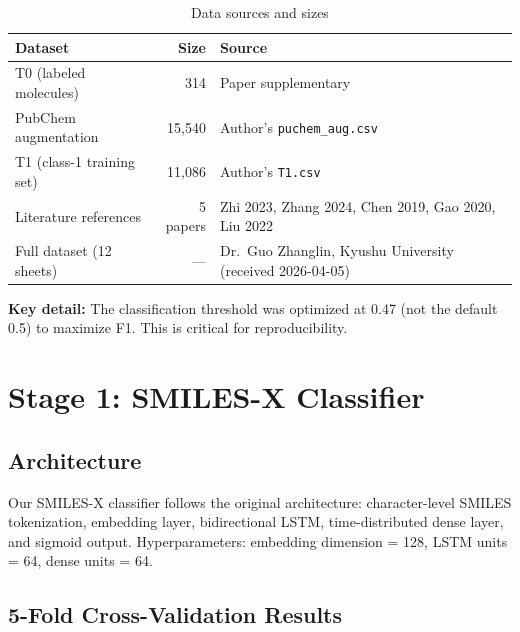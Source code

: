 \documentclass[11pt]{article}
\begin{document}
\begin{table}[H]
\centering
\caption{Data sources and sizes}
\label{tab:data}
\small
\begin{tabular}{@{}lrl@{}}
\toprule
\textbf{Dataset} & \textbf{Size} & \textbf{Source} \\
\midrule
T0 (labeled molecules) & 314 & Paper supplementary \\
PubChem augmentation & 15,540 & Author's \texttt{puchem\_aug.csv} \\
T1 (class-1 training set) & 11,086 & Author's \texttt{T1.csv} \\
Literature references & 5 papers & Zhi 2023, Zhang 2024, Chen 2019, Gao 2020, Liu 2022 \\
Full dataset (12 sheets) & --- & Dr.\ Guo Zhanglin, Kyushu University (received 2026-04-05) \\
\bottomrule
\end{tabular}
\end{table}

\noindent\textbf{Key detail:} The classification threshold was optimized at 0.47 (not the default 0.5) to maximize F1. This is critical for reproducibility.

\section{Stage 1: SMILES-X Classifier}

\subsection{Architecture}

Our SMILES-X classifier follows the original architecture: character-level SMILES tokenization, embedding layer, bidirectional LSTM, time-distributed dense layer, and sigmoid output. Hyperparameters: embedding dimension = 128, LSTM units = 64, dense units = 64.

\subsection{5-Fold Cross-Validation Results}
\end{document}
